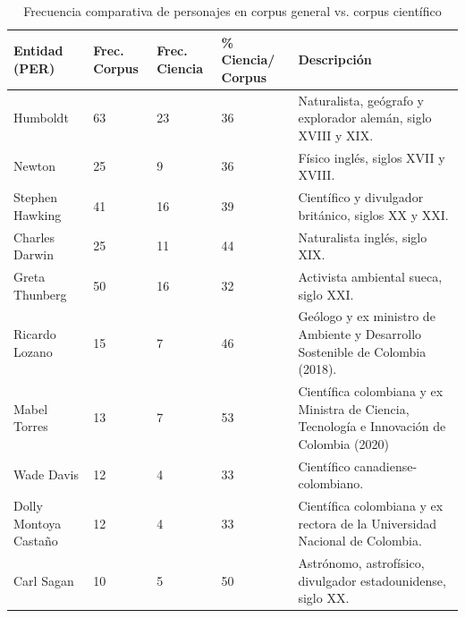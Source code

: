 \documentclass[11pt,a4paper]{article}
\begin{document}
	\begin{table}[H]
		\centering
		\caption{Frecuencia comparativa de personajes en corpus general vs. corpus científico}
		\label{tab:ents_per}
		\footnotesize 

		\begin{tabular}{p{3cm}P{2.2cm}P{2.2cm}P{2.2cm}p{5cm}}
			\toprule
			\textbf{Entidad (PER)} & 
			\textbf{Frec. Corpus} & 
			\textbf{Frec. Ciencia} & 
			\textbf{\% Ciencia/ Corpus} & 
			\textbf{Descripción} \\
			\midrule
			Humboldt & 63 & 23 & 36 & Naturalista, geógrafo y explorador alemán, siglo XVIII y XIX. \\
			Newton & 25 & 9 & 36 & Físico inglés, siglos XVII y XVIII. \\
			Stephen Hawking & 41 & 16 & 39 & Científico y divulgador británico, siglos XX y XXI. \\
			Charles Darwin & 25 & 11 & 44 & Naturalista inglés, siglo XIX. \\
			Greta Thunberg & 50 & 16 & 32 & Activista ambiental sueca, siglo XXI. \\
			Ricardo Lozano & 15 & 7 & 46 & Geólogo y ex ministro de Ambiente y Desarrollo Sostenible de Colombia (2018). \\
			Mabel Torres & 13 & 7 & 53 & Científica colombiana y ex Ministra de Ciencia, Tecnología e Innovación de Colombia (2020) \\
			Wade Davis & 12 & 4 & 33 & Científico canadiense-colombiano. \\
			Dolly Montoya Castaño & 12 & 4 & 33 & Científica colombiana y ex rectora de la Universidad Nacional de Colombia. \\
			Carl Sagan & 10 & 5 & 50 & Astrónomo, astrofísico, divulgador estadounidense, siglo XX.\\
			
			\bottomrule
		\end{tabular}
	\end{table}
	
\end{document}
